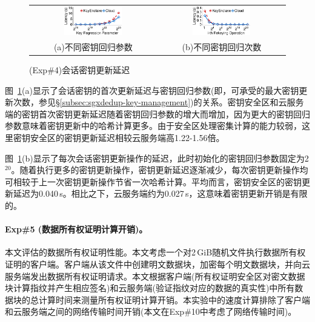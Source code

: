 \begin{figure}[!htb]
    \centering
    \begin{tabular}{@{\ }c@{\ }c}
        \includegraphics[width=0.48\textwidth]{pic/sgxdedup/expa5_keyRegression_time.pdf} & 
        \includegraphics[width=0.48\textwidth]{pic/sgxdedup/expa5_keyRegression_time_default.pdf} \\
        \mbox{\small (a)不同密钥回归参数}                                                 & 
        \mbox{\small (b)不同密钥回归次数}
    \end{tabular}
    \caption{(Exp\#4)会话密钥更新延迟}
    \label{fig:sgxdedup-rekeyingLatency}
\end{figure}

图~\ref{fig:sgxdedup-rekeyingLatency}(a)显示了会话密钥的首次更新延迟与密钥回归参数(即，可承受的最大密钥更新次数，参见\S\ref{subsec:sgxdedup-key-management})的关系。密钥安全区和云服务端的密钥首次密钥更新延迟随着密钥回归参数的增大而增加，因为更大的密钥回归参数意味着密钥更新中的哈希计算更多。由于安全区处理密集计算的能力较弱\cite{harnik2018SGX}，这里密钥安全区的密钥更新延迟相较云服务端高1.22-1.56倍。

图~\ref{fig:sgxdedup-rekeyingLatency}(b)显示了每次会话密钥更新操作的延迟，此时初始化的密钥回归参数固定为2$^{20}$。随着执行更多的密钥更新操作，密钥更新延迟逐渐减少，每次密钥更新操作均可相较于上一次密钥更新操作节省一次哈希计算。平均而言，密钥安全区的密钥更新延迟为0.040\,s。相比之下，云服务端约为0.027\,s，这意味着密钥更新开销是有限的。

\paragraph*{Exp\#5 (数据所有权证明计算开销)。}本文评估\sysnameS 的数据所有权证明性能。本文考虑一个对2\,GiB随机文件执行数据所有权证明的客户端。客户端从该文件中创建明文数据块，加密每个明文数据块，并向云服务端发出数据所有权证明请求。本文根据客户端(所有权证明安全区对密文数据块计算指纹并产生相应签名)和云服务端(验证指纹对应的数据的真实性)中所有数据块的总计算时间来测量所有权证明计算开销。本实验中的速度计算排除了客户端和云服务端之间的网络传输时间开销(本文在Exp\#10中考虑了网络传输时间)。

